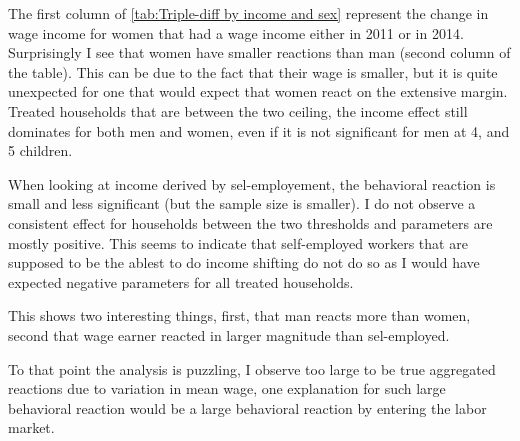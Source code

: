\begin{table}[H]
{\begin{tabular}{lccccccccccccccccccccccccccccccccc}
                         
\bottomrule
\end{tabular}
}
\end{table}       





The first column of \autoref{tab:Triple-diff by income and sex} represent the change in wage income for women that had a wage income either in 2011 or in 2014.
Surprisingly I see that women have smaller reactions than man (second column of the table). This can be due to the fact that their wage is smaller, but it is quite unexpected for one that would expect that women react on the extensive margin. 
Treated households that are between the two ceiling, the income effect still dominates for both men and women, even if it is not significant for men at 4, and 5 children.

When looking at income derived by sel-employement, the behavioral reaction is small and less significant (but the sample size is smaller). I do not observe a consistent effect for households between the two thresholds and parameters are mostly positive. This seems to indicate that self-employed workers that are supposed to be the ablest to do income shifting do not do so as I would have expected negative parameters for all treated households.


This shows two interesting things, first, that man reacts more than women, second that wage earner reacted in larger magnitude than sel-employed.



To that point the analysis is puzzling, I observe too large to be true aggregated reactions due to variation in mean wage, one explanation for such large behavioral reaction would be a large behavioral reaction by entering the labor market. %





